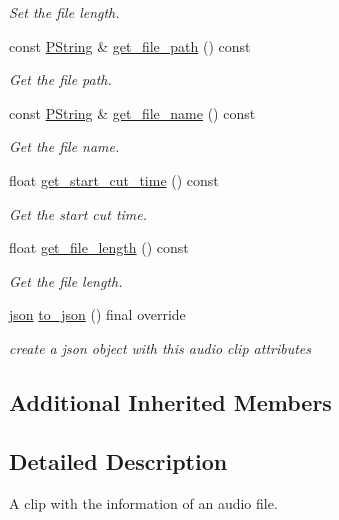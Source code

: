 \begin{DoxyCompactItemize}
\begin{DoxyCompactList}\small\item\em Set the file length. \end{DoxyCompactList}\item 
const \mbox{\hyperlink{classprz_1_1_p_string}{P\+String}} \& \mbox{\hyperlink{classprz_1_1_audio___clip_a06d95e1ba1b854e8f00b2ec3602d3c5f}{get\+\_\+file\+\_\+path}} () const
\begin{DoxyCompactList}\small\item\em Get the file path. \end{DoxyCompactList}\item 
const \mbox{\hyperlink{classprz_1_1_p_string}{P\+String}} \& \mbox{\hyperlink{classprz_1_1_audio___clip_a548005698eae9ec6499fe1f02f69ecf1}{get\+\_\+file\+\_\+name}} () const
\begin{DoxyCompactList}\small\item\em Get the file name. \end{DoxyCompactList}\item 
float \mbox{\hyperlink{classprz_1_1_audio___clip_a0000a44ffec1e064301fd93750806aab}{get\+\_\+start\+\_\+cut\+\_\+time}} () const
\begin{DoxyCompactList}\small\item\em Get the start cut time. \end{DoxyCompactList}\item 
float \mbox{\hyperlink{classprz_1_1_audio___clip_aa64143bed59cae5e2809284ad5765b52}{get\+\_\+file\+\_\+length}} () const
\begin{DoxyCompactList}\small\item\em Get the file length. \end{DoxyCompactList}\item 
\mbox{\hyperlink{namespaceprz_a2d8e9eeb62cf098759f1fff869da67f7}{json}} \mbox{\hyperlink{classprz_1_1_audio___clip_a15fdef4e8547e25d06785d816be71a12}{to\+\_\+json}} () final override
\begin{DoxyCompactList}\small\item\em create a json object with this audio clip attributes \end{DoxyCompactList}\end{DoxyCompactItemize}
\subsection*{Additional Inherited Members}


\subsection{Detailed Description}
A clip with the information of an audio file. 




